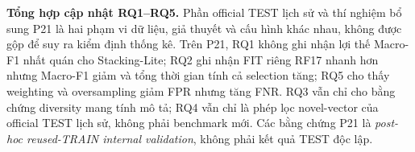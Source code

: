 \noindent\textbf{Tổng hợp cập nhật RQ1--RQ5.} Phần official TEST lịch sử và thí nghiệm bổ sung P21 là hai phạm vi dữ liệu, giả thuyết và cấu hình khác nhau, không được gộp để suy ra kiểm định thống kê. Trên P21, RQ1 không ghi nhận lợi thế Macro-F1 nhất quán cho Stacking-Lite; RQ2 ghi nhận FIT riêng RF17 nhanh hơn nhưng Macro-F1 giảm và tổng thời gian tính cả selection tăng; RQ5 cho thấy weighting và oversampling giảm FPR nhưng tăng FNR. RQ3 vẫn chỉ cho bằng chứng diversity mang tính mô tả; RQ4 vẫn chỉ là phép lọc novel-vector của official TEST lịch sử, không phải benchmark mới. Các bằng chứng P21 là \emph{post-hoc reused-TRAIN internal validation}, không phải kết quả TEST độc lập.
